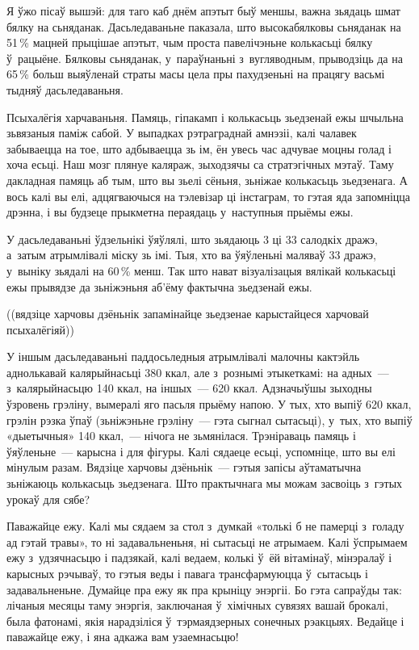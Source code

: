 Я ўжо пісаў вышэй: для таго каб днём апэтыт быў меншы, важна зьядаць шмат бялку на сьняданак. Дасьледаваньне паказала, што высокабялковы сьняданак на 51\,\% мацней прыцішае апэтыт, чым проста павелічэньне колькасьці бялку ў~рацыёне. Бялковы сьняданак, у~параўнаньні з~вугляводным, прыводзіць да на 65\,\% больш выяўленай страты масы цела пры пахудзеньні на працягу васьмі тыдняў дасьледаваньня.

Псыхалёгія харчаваньня. Памяць, гіпакамп і колькасьць зьедзенай ежы шчыльна зьвязаныя паміж сабой. У выпадках рэтраграднай амнэзіі, калі чалавек забываецца на тое, што адбываецца зь ім, ён увесь час адчувае моцны голад і хоча есьці. Наш мозг плянуе каляраж, зыходзячы са стратэгічных мэтаў. Таму дакладная памяць аб тым, што вы зьелі сёньня, зьніжае колькасьць зьедзенага. А вось калі вы елі, адцягваючыся на тэлевізар ці інстаграм, то гэтая яда запомніцца дрэнна, і вы будзеце прыкметна пераядаць у~наступныя прыёмы ежы.

У дасьледаваньні ўдзельнікі ўяўлялі, што зьядаюць 3 ці 33 салодкіх дражэ, а~затым атрымлівалі міску зь імі. Тыя, хто ва ўяўленьні маляваў 33 дражэ, у~выніку зьядалі на 60\,\% менш. Так што нават візуалізацыя вялікай колькасьці ежы прывядзе да зьніжэньня аб'ёму фактычна зьедзенай ежы.

((вядзіце харчовы дзёньнік запамінайце зьедзенае карыстайцеся харчовай псыхалёгіяй))

У іншым дасьледаваньні паддосьледныя атрымлівалі малочны кактэйль аднолькавай калярыйнасьці 380 ккал, але з~рознымі этыкеткамі: на адных~--- з~калярыйнасьцю 140 ккал, на іншых~--- 620 ккал. Адзначыўшы зыходны ўзровень грэліну, вымералі яго пасьля прыёму напою. У тых, хто выпіў 620 ккал, грэлін рэзка ўпаў (зьніжэньне грэліну~--- гэта сыгнал сытасьці), у~тых, хто выпіў «дыетычныя» 140 ккал,~--- нічога не зьмянілася. Трэніраваць памяць і ўяўленьне~--- карысна і для фігуры. Калі сядаеце есьці, успомніце, што вы елі мінулым разам. Вядзіце харчовы дзёньнік~--- гэтыя запісы аўтаматычна зьніжаюць колькасьць зьедзенага. Што практычнага мы можам засвоіць з~гэтых урокаў для сябе?

Паважайце ежу. Калі мы сядаем за стол з~думкай «толькі б не памерці з~голаду ад гэтай травы», то ні задавальненьня, ні сытасьці не атрымаем. Калі ўспрымаем ежу з~удзячнасьцю і падзякай, калі ведаем, колькі ў~ёй вітамінаў, мінэралаў і карысных рэчываў, то гэтыя веды і павага трансфармуюцца ў~сытасьць і задавальненьне. Думайце пра ежу як пра крыніцу энэргіі. Бо гэта сапраўды так: лічаныя месяцы таму энэргія, заключаная ў~хімічных сувязях вашай брокалі, была фатонамі, якія нарадзіліся ў~тэрмаядзерных сонечных рэакцыях. Ведайце і паважайце ежу, і яна адкажа вам узаемнасьцю!

